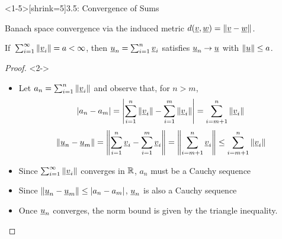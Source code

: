 \documentclass[10pt,english,aspectratio=169]{beamer}
\begin{document}
\begin{frame}<1-5>[shrink=5]{3.5: Convergence of Sums}


Banach space convergence via the induced metric $d(\underline{v}, \underline{w}) = \| \underline{v}-\underline{w} \|$.

\newcommand{\vtp}{\hspace{-0.02em}}
\begin{lemma}
If $\,\sum_{i=1}^\infty \| \vecnot{v}_i \| \vtp = \vtp a \vtp <\vtp \infty$, then $\vecnot{u}_n \vtp = \vtp \sum_{i=1}^n \vecnot{v}_i$ satisfies $\vecnot{u}_n \vtp \to \vtp \vecnot{u}$ with $\| \vecnot{u} \| \vtp \leq \vtp a$.
\end{lemma}
\vspace{-0.5mm}

\begin{proof}<2->
\begin{itemize}
\item<2-> Let $a_n = \sum_{i=1}^n \| \underline{v}_i \|$ and observe that, for $n\!>\!m$, \vspace{-2mm}
\[ |a_n - a_m| = \left| \sum_{i=1}^n \| \underline{v}_i \| - \sum_{i=1}^m \| \underline{v}_i \|  \right| = \sum_{i=m+1}^n \| \underline{v}_i \| \]
\vspace{-2mm}
\[ \|\underline{u}_n - \underline{u}_m \| = \left\| \sum_{i=1}^n \underline{v}_i - \sum_{i=1}^m \underline{v}_i  \right\| = \left\| \sum_{i=m+1}^n \underline{v}_i \right\| \leq \sum_{i=m+1}^n \| \underline{v}_i \| \]

\item<3-> Since $\sum_{i=1}^\infty \| \underline{v}_i \|$ converges in $\mathbb{R}$, $a_n$ must be a Cauchy sequence \vspace{1mm}

\item<4-> Since $\|\underline{u}_n - \underline{u}_m\| \leq |a_n - a_m|$, $\underline{u}_n$ is also a Cauchy sequence \vspace{1mm}

\item<5-> Once $\underline{u}_n$ converges, the norm bound is given by the triangle inequality. \hfill \qedhere

\end{itemize}

\end{proof}


\end{frame}
\end{document}

